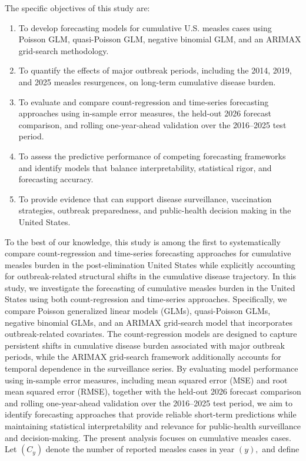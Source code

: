 \documentclass[utf8]{FrontiersinHarvard} %
\begin{document}
The specific objectives of this study are:
\begin{enumerate}
\item To develop forecasting models for cumulative U.S. measles cases using Poisson GLM, quasi-Poisson GLM, negative binomial GLM, and an ARIMAX grid-search methodology.
\item To quantify the effects of major outbreak periods, including the 2014, 2019, and 2025 measles resurgences, on long-term cumulative disease burden.
\item To evaluate and compare count-regression and time-series forecasting approaches using in-sample error measures, the held-out 2026 forecast comparison, and rolling one-year-ahead validation over the 2016--2025 test period.
\item To assess the predictive performance of competing forecasting frameworks and identify models that balance interpretability, statistical rigor, and forecasting accuracy.

\item To provide evidence that can support disease surveillance, vaccination strategies, outbreak preparedness, and public-health decision making in the United States.
\end{enumerate}
To the best of our knowledge, this study is among the first to systematically compare count-regression and time-series forecasting approaches for cumulative measles burden in the post-elimination United States while explicitly accounting for outbreak-related structural shifts in the cumulative disease trajectory.
In this study, we investigate the forecasting of cumulative measles burden in the United States using both count-regression and time-series approaches. Specifically, we compare Poisson generalized linear models (GLMs), quasi-Poisson GLMs, negative binomial GLMs, and an ARIMAX grid-search model that incorporates outbreak-related covariates. The count-regression models are designed to capture persistent shifts in cumulative disease burden associated with major outbreak periods, while the ARIMAX grid-search framework additionally accounts for temporal dependence in the surveillance series. By evaluating model performance using in-sample error measures, including mean squared error (MSE) and root mean squared error (RMSE), together with the held-out 2026 forecast comparison and rolling one-year-ahead validation over the 2016--2025 test period, we aim to identify forecasting approaches that provide reliable short-term predictions while maintaining statistical interpretability and relevance for public-health surveillance and decision-making. The present analysis focuses on cumulative measles cases. Let $(C_y)$ denote the number of reported measles cases in year $(y),$ and define
\end{document}
